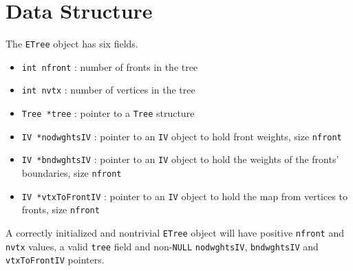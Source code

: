 \par
\section{Data Structure}
\par
The {\tt ETree} object has six fields.
\begin{itemize}
\item {\tt int nfront} : number of fronts in the tree
\item {\tt int nvtx} : number of vertices in the tree
\item {\tt Tree *tree} : pointer to a {\tt Tree} structure
\item {\tt IV  *nodwghtsIV} : pointer to an {\tt IV} object to hold
front weights, size {\tt nfront}
\item {\tt IV  *bndwghtsIV} : pointer to an {\tt IV} object to hold
the weights of the fronts' boundaries, size {\tt nfront}
\item {\tt IV  *vtxToFrontIV} : pointer to an {\tt IV} object to hold
the map from vertices to fronts, size {\tt nfront}
\end{itemize}
A correctly initialized and nontrivial {\tt ETree} object 
will have positive {\tt nfront} and {\tt nvtx} values,
a valid {\tt tree} field and non-{\tt NULL}
{\tt nodwghtsIV}, {\tt bndwghtsIV} and {\tt vtxToFrontIV} pointers.
